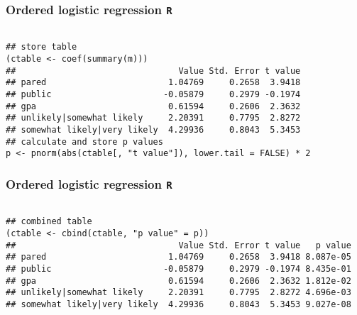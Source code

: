 \documentclass[00-GLMregslides.tex]{subfiles}
\begin{document}
\begin{frame}[fragile]
	\frametitle{Ordered logistic regression \texttt{R} }
	\large
\begin{framed}		
	\begin{verbatim}
		
## store table
(ctable <- coef(summary(m)))
##                                Value Std. Error t value
## pared                        1.04769     0.2658  3.9418
## public                      -0.05879     0.2979 -0.1974
## gpa                          0.61594     0.2606  2.3632
## unlikely|somewhat likely     2.20391     0.7795  2.8272
## somewhat likely|very likely  4.29936     0.8043  5.3453
## calculate and store p values
p <- pnorm(abs(ctable[, "t value"]), lower.tail = FALSE) * 2
\end{verbatim}
\end{framed}
\end{frame}
\begin{frame}[fragile]
	\frametitle{Ordered logistic regression \texttt{R} }
	\large
\begin{framed}		
	\begin{verbatim}
		
## combined table
(ctable <- cbind(ctable, "p value" = p))
##                                Value Std. Error t value   p value
## pared                        1.04769     0.2658  3.9418 8.087e-05
## public                      -0.05879     0.2979 -0.1974 8.435e-01
## gpa                          0.61594     0.2606  2.3632 1.812e-02
## unlikely|somewhat likely     2.20391     0.7795  2.8272 4.696e-03
## somewhat likely|very likely  4.29936     0.8043  5.3453 9.027e-08
\end{verbatim}
\end{framed}
\end{frame}
\end{document}
